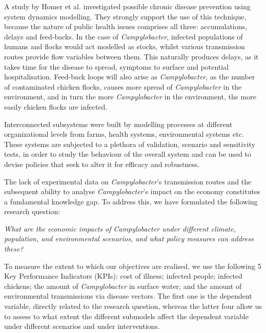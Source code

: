 A study by Homer et al. investigated possible chronic disease prevention using system dynamics modelling. They strongly support the use of this technique, because the nature of public health issues comprises all three: accumulations, delays and feed-backs\parencite{homer_system_2006}. In the case of \textit{Campylobacter}, infected populations of humans and flocks would act modelled as stocks, whilst various transmission routes provide flow variables between them. This naturally produces delays, as it takes time for the disease to spread, symptoms to surface and potential hospitalisation. Feed-back loops will also arise as \textit{Campylobacter}, as the number of contaminated chicken flocks, causes more spread of \textit{Campylobacter} in the environment, and in turn the more \textit{Campylobacter} in the environment, the more easily chicken flocks are infected. 

Interconnected subsystems were built by modelling processes at different organizational levels from farms, health systems, environmental systems etc. These systems are subjected to a plethora of validation, scenario and sensitivity tests, in order to study the behaviour of the overall system and can be used to devise policies that seek to alter it for efficacy and robustness. 


The lack of experimental data on \textit{Campylobacter}’s transmission routes and the subsequent ability to analyse \textit{Campylobacter}’s impact on the economy constitutes a fundamental knowledge gap. To address this, we have formulated the following research question:
\begin{center}\textit{\textcolor{NiceBlue}{
What are the economic impacts of Campylobacter under different climate, population, and environmental scenarios, and what policy measures can address these? 
}}
\end{center}
To measure the extent to which our objectives are realised, we use the following 5 Key Performance Indicators (KPIs): cost of illness; infected people; infected chickens; the amount of \textit{Campylobacter} in surface water; and the amount of environmental transmissions via disease vectors. The first one is the dependent variable, directly related to the research question, whereas the latter four allow us to assess to what extent the different submodels affect the dependent variable under different scenarios and under interventions.

